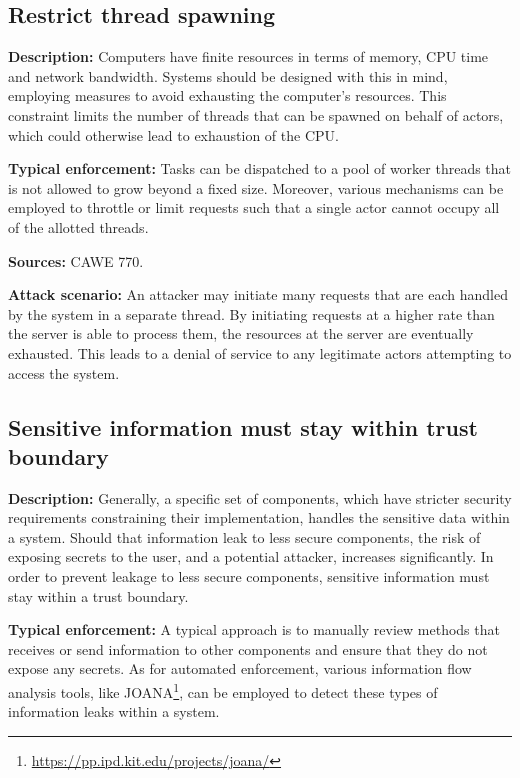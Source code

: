 \subsection{Restrict thread spawning}

\textbf{Description:} Computers have finite resources in terms of memory, CPU time and network bandwidth. Systems should be designed with this in mind, employing measures to avoid exhausting the computer's resources. This constraint limits the number of threads that can be spawned on behalf of actors, which could otherwise lead to exhaustion of the CPU.
 
 \textbf{Typical enforcement:} Tasks can be dispatched to a pool of worker threads that is not allowed to grow beyond a fixed size. Moreover, various mechanisms can be employed to throttle or limit requests such that a single actor cannot occupy all of the allotted threads.
 
 \textbf{Sources:} CAWE 770.
 
 \textbf{Attack scenario:} An attacker may initiate many requests that are each handled by the system in a separate thread. By initiating requests at a higher rate than the server is able to process them, the resources at the server are eventually exhausted. This leads to a denial of service to any legitimate actors attempting to access the system.

\subsection{Sensitive information must stay within trust boundary}\label{sec:trust_boundry_constraint}

\textbf{Description:} 
Generally, a specific set of components, which have stricter security requirements constraining their implementation, handles the sensitive data within a system. Should that information leak to less secure components, the risk of exposing secrets to the user, and a potential attacker, increases significantly. In order to prevent leakage to less secure components, sensitive information must stay within a trust boundary.
 
 \textbf{Typical enforcement:}
 A typical approach is to manually review methods that receives or send information to other components and ensure that they do not expose any secrets. As for automated enforcement, various information flow analysis tools, like JOANA\footnote{\url{https://pp.ipd.kit.edu/projects/joana/}}, can be employed to detect these types of information leaks within a system.
 
